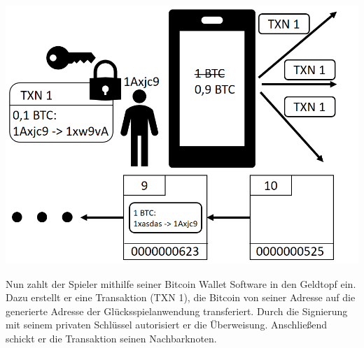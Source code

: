 \vspace{1cm}
\begin{minipage}{0.55\textwidth}
\includegraphics[width=\textwidth]{Figures/konzept_btc/konzept3}
\centering
\decoRule
{}
\label{fig:konzept3}
\end{minipage}
\begin{minipage}{0.45\textwidth}
Nun zahlt der Spieler mithilfe seiner Bitcoin Wallet Software in den Geldtopf ein. Dazu erstellt er eine Transaktion (TXN 1), die Bitcoin von seiner Adresse auf die generierte Adresse der Glücksspielanwendung transferiert. Durch die Signierung mit seinem privaten Schlüssel autorisiert er die Überweisung. Anschließend schickt er die Transaktion seinen Nachbarknoten.
\end{minipage}

